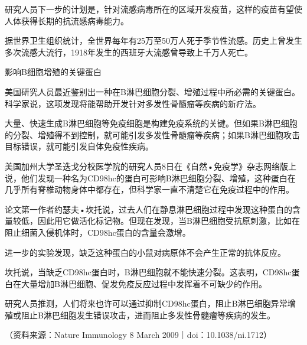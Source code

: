 研究人员下一步的计划是，针对流感病毒所在的区域开发疫苗，这样的疫苗有望使人体获得长期的抗流感病毒能力。

据世界卫生组织统计，全世界每年有25万至50万人死于季节性流感。历史上曾发生多次流感大流行，1918年发生的西班牙大流感曾导致上千万人死亡。

\begin{center}
{\Large 影响B细胞增殖的关键蛋白}
\end{center}
美国研究人员最近鉴别出一种在B淋巴细胞分裂、增殖过程中所必需的关键蛋白。科学家说，这项发现将能帮助开发针对多发性骨髓瘤等疾病的新疗法。

大量、快速生成B淋巴细胞等免疫细胞是构建免疫系统的关键。但如果B淋巴细胞的分裂、增殖得不到控制，就可能引发多发性骨髓瘤等疾病；如果B淋巴细胞攻击目标错误，就可能引发自体免疫性疾病。

美国加州大学圣迭戈分校医学院的研究人员8日在《自然•免疫学》杂志网络版上说，他们发现一种名为CD98hc的蛋白可影响B淋巴细胞分裂、增殖，这种蛋白在几乎所有脊椎动物身体中都存在，但科学家一直不清楚它在免疫过程中的作用。

论文第一作者约瑟夫•坎托说，过去人们在静息淋巴细胞过程中发现这种蛋白的含量较低，因此用它做活化标记物。但现在发现，当B淋巴细胞受抗原刺激，比如在阻止细菌入侵机体时，CD98hc蛋白的含量会激增。

进一步的实验发现，缺乏这种蛋白的小鼠对病原体不会产生正常的抗体反应。

坎托说，当缺乏CD98hc蛋白时，B淋巴细胞就不能快速分裂。这表明，CD98hc蛋白在大量增加B淋巴细胞、促发免疫反应过程中发挥着不可缺少的作用。

研究人员推测，人们将来也许可以通过抑制CD98hc蛋白，阻止B淋巴细胞异常增殖或阻止B淋巴细胞发生错误攻击，进而阻止多发性骨髓瘤等疾病的发生。

（资料来源：Nature Immunology 8 March 2009｜doi：10.1038/ni.1712）


